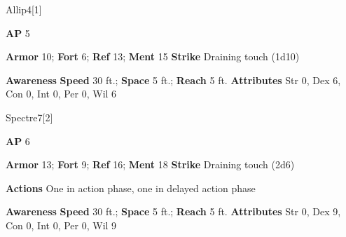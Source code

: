 \begin{monsection}{Allip}{4}[1]
\vspace{-1em}\vspace{-1em}
\begin{spellcontent}
\begin{spelltargetinginfo}
{\textbf{AP} 5}

\pari \textbf{Armor} 10;
\textbf{Fort} 6;
\textbf{Ref} 13;
\textbf{Ment} 15
\pari \textbf{Strike} Draining touch  (1d10)



\end{spelltargetinginfo}


\end{spellcontent}

\begin{monsterfooter}
\pari \textbf{Awareness} 
\pari \textbf{Speed} 30 ft.;
\textbf{Space} 5 ft.;
\textbf{Reach} 5 ft.
\pari \textbf{Attributes}
Str 0,
Dex 6,
Con 0,
Int 0,
Per 0,
Wil 6
\end{monsterfooter}
\end{monsection}



\begin{monsection}{Spectre}{7}[2]
\vspace{-1em}\vspace{-1em}
\begin{spellcontent}
\begin{spelltargetinginfo}
{\textbf{AP} 6}

\pari \textbf{Armor} 13;
\textbf{Fort} 9;
\textbf{Ref} 16;
\textbf{Ment} 18
\pari \textbf{Strike} Draining touch  (2d6)


\pari \textbf{Actions} One in action phase, one in delayed action phase
\end{spelltargetinginfo}


\end{spellcontent}

\begin{monsterfooter}
\pari \textbf{Awareness} 
\pari \textbf{Speed} 30 ft.;
\textbf{Space} 5 ft.;
\textbf{Reach} 5 ft.
\pari \textbf{Attributes}
Str 0,
Dex 9,
Con 0,
Int 0,
Per 0,
Wil 9
\end{monsterfooter}
\end{monsection}



